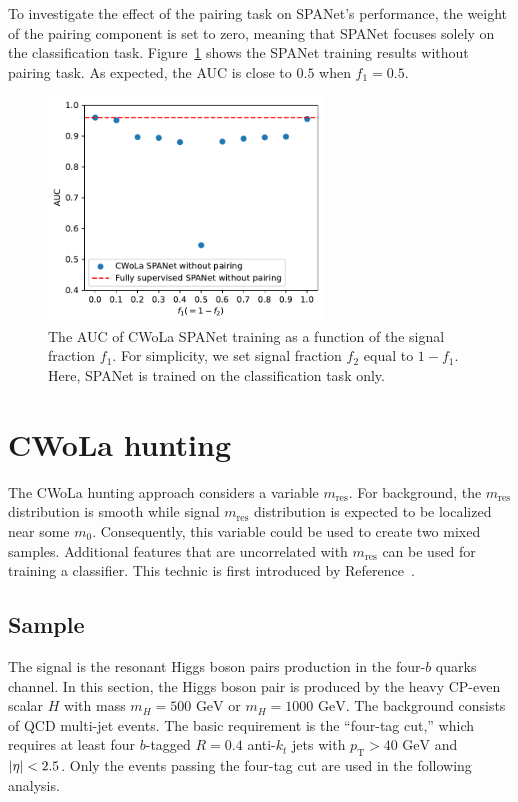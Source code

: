 \documentclass[12pt]{article}
\begin{document}
		To investigate the effect of the pairing task on SPANet's performance, the weight of the pairing component is set to zero, meaning that SPANet focuses solely on the classification task. Figure~\ref{fig:CWoLa_SPANet_without_pairing} shows the SPANet training results without pairing task. As expected, the AUC is close to $0.5$ when $f_1 = 0.5$. 
		\begin{figure}[htpb]
			\centering
			\includegraphics[width=0.65\textwidth]{CWoLa_SPANet_no_pair.pdf}
			\caption{The AUC of CWoLa SPANet training as a function of the signal fraction $f_1$. For simplicity, we set signal fraction $f_2$ equal to $1 - f_1$. Here, SPANet is trained on the classification task only.}
			\label{fig:CWoLa_SPANet_without_pairing}
		\end{figure}	

\section{CWoLa hunting}%
\label{sec:cwola_hunting}
	The CWoLa hunting approach considers a variable $m_{\text{res}}$. For background, the $m_{\text{res}}$ distribution is smooth while signal $m_{\text{res}}$ distribution is expected to be localized near some $m_0$. Consequently, this variable could be used to create two mixed samples. Additional features that are uncorrelated with $m_{\text{res}}$ can be used for training a classifier. This technic is first introduced by Reference~\cite{Collins:2018epr}.
	\subsection{Sample}%
	\label{sub:sample_cwola_hunting}
		The signal is the resonant Higgs boson pairs production in the four-$b$ quarks channel. In this section, the Higgs boson pair is produced by the heavy CP-even scalar $H$ with mass $m_H = \text{500 GeV}$ or $m_H = \text{1000 GeV}$. The background consists of QCD multi-jet events. The basic requirement is the ``four-tag cut,'' which requires at least four $b$-tagged $R = 0.4$ anti-$k_t$ jets with $p_\text{T} > \text{40 GeV}$ and $\abs{\eta} < 2.5$. Only the events passing the four-tag cut are used in the following analysis.
		
\end{document}
